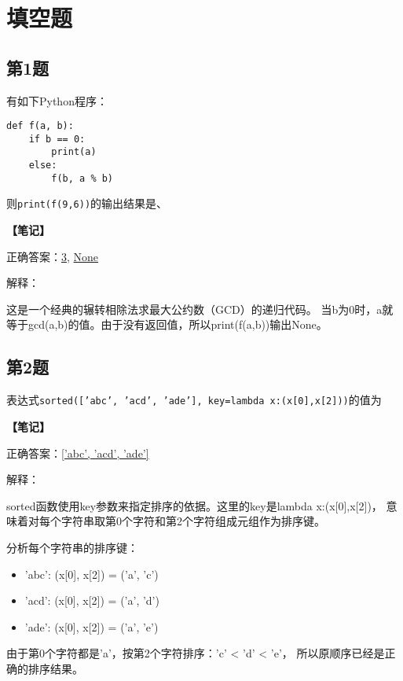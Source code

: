 \section{填空题}

\subsection{第1题}
有如下Python程序：
\begin{lstlisting}
def f(a, b):
    if b == 0:
        print(a)
    else:
        f(b, a % b)
\end{lstlisting}
则\texttt{print(f(9,6))}的输出结果是\underline{\hspace{2cm}}、\underline{\hspace{2cm}}

\begin{mdframed}[linewidth=1pt, linecolor=black]

  \textbf{\color{red}【笔记】}

  正确答案：\underline{3}, \underline{None}

  解释：

  \qquad 这是一个经典的辗转相除法求最大公约数（GCD）的递归代码。
  当b为0时，a就等于gcd(a,b)的值。由于没有返回值，所以print(f(a,b))输出None。

\end{mdframed}

\subsection{第2题}
表达式\texttt{sorted(['abc', 'acd', 'ade'], key=lambda x:(x[0],x[2]))}的值为\\
\underline{\hspace{8cm}}

\begin{mdframed}[linewidth=1pt, linecolor=black]

  \textbf{\color{red}【笔记】}

  正确答案：\underline{['abc', 'acd', 'ade']}

  解释：

  \qquad sorted函数使用key参数来指定排序的依据。这里的key是lambda x:(x[0],x[2])，
  意味着对每个字符串取第0个字符和第2个字符组成元组作为排序键。

  \qquad 分析每个字符串的排序键：
  \begin{itemize}
    \item 'abc': (x[0], x[2]) = ('a', 'c')
    \item 'acd': (x[0], x[2]) = ('a', 'd')
    \item 'ade': (x[0], x[2]) = ('a', 'e')
  \end{itemize}

  \qquad 由于第0个字符都是'a'，按第2个字符排序：'c' < 'd' < 'e'，
  所以原顺序已经是正确的排序结果。

\end{mdframed}

